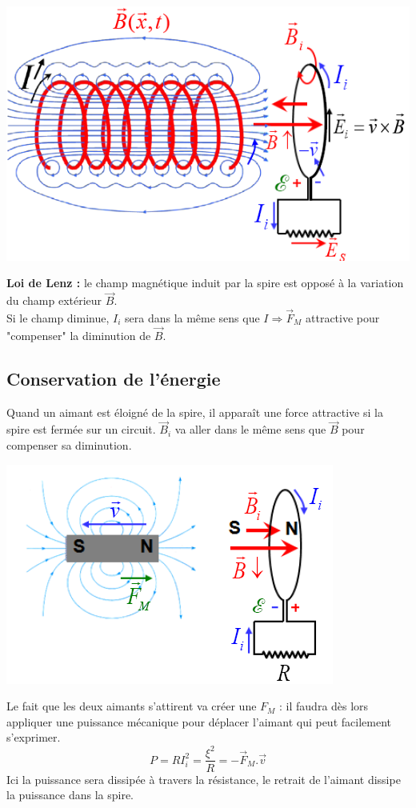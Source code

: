 \documentclass	[11pt, a4paper, openany]{book}
\begin{document}
\begin{center}
	\includegraphics[scale=0.55]{em/image17.png}\\
\end{center}
\textbf{Loi de Lenz :} le champ magnétique induit par la spire est opposé à la variation du champ extérieur $\vec{B}$.\\
Si le champ diminue, $I_i$ sera dans la même sens que $I \Rightarrow \vec{F}_M$ attractive pour "compenser" la diminution de $\vec{B}$.

\subsection{Conservation de l'énergie}
Quand un aimant est éloigné de la spire, il apparaît une force attractive si la spire est fermée sur un circuit. $\vec{B}_i$ va aller dans le même sens que $\vec{B}$ pour compenser sa diminution.
\begin{center}
	\includegraphics[scale=0.45]{em/image18.png}\\
\end{center}
Le fait que les deux aimants s'attirent va créer une $F_M$ : il faudra dès lors appliquer une puissance mécanique pour déplacer l'aimant qui peut facilement s'exprimer.
\begin{equation}
	P = RI_i^2 = \frac{\xi^2}{R} = -\vec{F}_M.\vec{v}
\end{equation}
Ici la puissance sera dissipée à travers la résistance, le retrait de l'aimant dissipe la puissance dans la spire.
\end{document}
